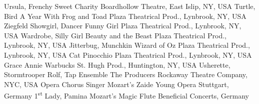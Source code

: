 \begin{cventries}
  \cventrytabb %
    {Ursula, Frenchy}%
    {Sweet Charity}%
    {Boardhollow Theatre, East Islip, NY, USA}%
    {} %
  \cventrytabb %
    {Turtle, Bird}%
    {A Year With Frog and Toad}%
    {Plaza Theatrical Prod., Lynbrook, NY, USA}%
    {} %
  \cventrytabb %
    {Ziegfeld Showgirl, Dancer}%
    {Funny Girl}%
    {Plaza Theatrical Prod., Lynbrook, NY, USA}%
    {} %
  \cventrytab %
    {Wardrobe, Silly Girl}%
    {Beauty and the Beast}%
    {Plaza Theatrical Prod., Lynbrook, NY, USA}%
    {} %
  \cventrytab %
    {Jitterbug, Munchkin}%
    {Wizard of Oz}%
    {Plaza Theatrical Prod., Lynbrook, NY, USA}%
    {} %
  \cventrytab %
    {Cat}%
    {Pinocchio}%
    {Plaza Theatrical Prod., Lynbrook, NY, USA}%
    {} %
  \cventrytab %
    {Grace}%
    {Annie Warbucks}%
    {St. Hugh Prod., Huntington, NY, USA}%
    {} %
  \cventrytab 
    {Usherette, Stormtrooper Rolf, Tap Ensemble}%
    {The Producers}%
    {Rockaway Theatre Company, NYC, USA}%
    {} %
  \cventrytab
    {Opera Chorus Singer}%
    {Mozart's Zaide}%
    {Young Opera Stuttgart, Germany}%
    {}
  \cventrytab
    {1\textsuperscript{st} Lady, Pamina}
    {Mozart's Magic Flute}
    {Beneficial Concerts, Germany}
    {}
\end{cventries}